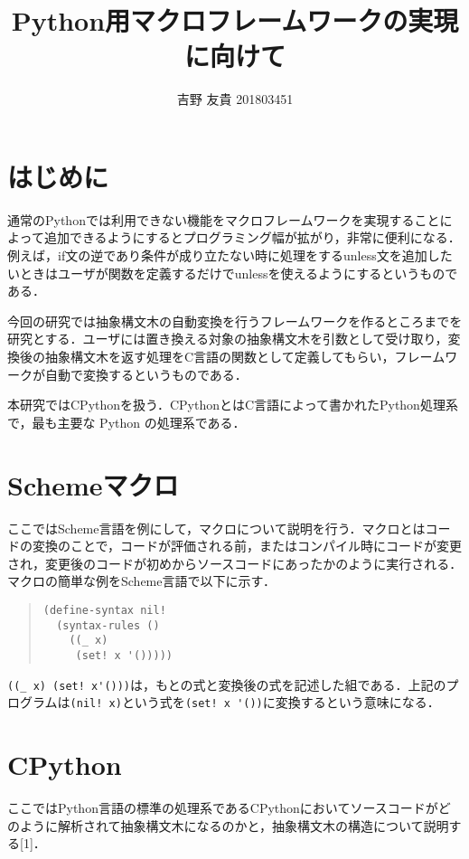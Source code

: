 \documentclass[twocolumn]{jsarticle}
\title{\textbf{Python用マクロフレームワークの実現に向けて}}
\author{吉野 友貴 201803451}
\date{} %
\begin{document}
\maketitle
\thispagestyle{fancy}

\section{はじめに}

通常のPythonでは利用できない機能をマクロフレームワークを実現することによって追加できるようにするとプログラミング幅が拡がり，非常に便利になる．例えば，if文の逆であり条件が成り立たない時に処理をするunless文を追加したいときはユーザが関数を定義するだけでunlessを使えるようにするというものである．

今回の研究では抽象構文木の自動変換を行うフレームワークを作るところまでを研究とする．ユーザには置き換える対象の抽象構文木を引数として受け取り，変換後の抽象構文木を返す処理をC言語の関数として定義してもらい，フレームワークが自動で変換するというものである．

本研究ではCPythonを扱う．CPythonとはC言語によって書かれたPython処理系で，最も主要な Python の処理系である．

\section{Schemeマクロ}

ここではScheme言語を例にして，マクロについて説明を行う．マクロとはコードの変換のことで，コードが評価される前，またはコンパイル時にコードが変更され，変更後のコードが初めからソースコードにあったかのように実行される．
マクロの簡単な例をScheme言語で以下に示す．

\begin{quote}
\setlength{\baselineskip}{14pt}
\begin{verbatim}
(define-syntax nil!
  (syntax-rules ()
    ((_ x)
     (set! x '()))))
\end{verbatim}
\end{quote}

\verb|((_ x) (set! x'()))|は，もとの式と変換後の式を記述した組である．上記のプログラムは\verb|(nil! x)|という式を\verb|(set! x '())|に変換するという意味になる．

\section{CPython}

ここではPython言語の標準の処理系であるCPythonにおいてソースコードがどのように解析されて抽象構文木になるのかと，抽象構文木の構造について説明する[1]．
\end{document}
